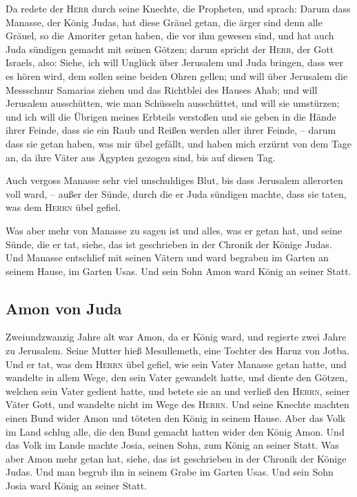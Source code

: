  Da redete der \textsc{Herr} durch seine Knechte, die
Propheten, und sprach:  Darum dass Manasse, der König
Judas, hat diese Gräuel getan, die ärger sind denn alle Gräuel, so die
Amoriter getan haben, die vor ihm gewesen sind, und hat auch Juda
sündigen gemacht mit seinen Götzen;  darum spricht der
\textsc{Herr}, der Gott Israels, also: Siehe, ich will Unglück über
Jerusalem und Juda bringen, dass wer es hören wird, dem sollen seine
beiden Ohren gellen;  und will über Jerusalem die
Messschnur Samarias ziehen und das Richtblei des Hauses Ahab; und will
Jerusalem ausschütten, wie man Schüsseln ausschüttet, und will sie
umstürzen;  und ich will die Übrigen meines Erbteils
verstoßen und sie geben in die Hände ihrer Feinde, dass sie ein Raub und
Reißen werden aller ihrer Feinde, --  darum dass sie
getan haben, was mir übel gefällt, und haben mich erzürnt von dem Tage
an, da ihre Väter aus Ägypten gezogen sind, bis auf diesen Tag.

 Auch vergoss Manasse sehr viel unschuldiges Blut, bis
dass Jerusalem allerorten voll ward, -- außer der Sünde, durch die er
Juda sündigen machte, dass sie taten, was dem \textsc{Herrn} übel
gefiel.

 Was aber mehr von Manasse zu sagen ist und alles, was er
getan hat, und seine Sünde, die er tat, siehe, das ist geschrieben in
der Chronik der Könige Judas.  Und Manasse entschlief mit
seinen Vätern und ward begraben im Garten an seinem Hause, im Garten
Usas. Und sein Sohn Amon ward König an seiner Statt.

\hypertarget{amon-von-juda}{%
\subsection{Amon von Juda}\label{amon-von-juda}}

 Zweiundzwanzig Jahre alt war Amon, da er König ward, und
regierte zwei Jahre zu Jerusalem. Seine Mutter hieß Mesullemeth, eine
Tochter des Haruz von Jotba.  Und er tat, was dem
\textsc{Herrn} übel gefiel, wie sein Vater Manasse getan hatte,
 und wandelte in allem Wege, den sein Vater gewandelt
hatte, und diente den Götzen, welchen sein Vater gedient hatte, und
betete sie an  und verließ den \textsc{Herrn}, seiner
Väter Gott, und wandelte nicht im Wege des \textsc{Herrn}.
 Und seine Knechte machten einen Bund wider Amon und
töteten den König in seinem Hause.  Aber das Volk im Land
schlug alle, die den Bund gemacht hatten wider den König Amon. Und das
Volk im Lande machte Josia, seinen Sohn, zum König an seiner Statt.
 Was aber Amon mehr getan hat, siehe, das ist geschrieben
in der Chronik der Könige Judas.  Und man begrub ihn in
seinem Grabe im Garten Usas. Und sein Sohn Josia ward König an seiner
Statt.

